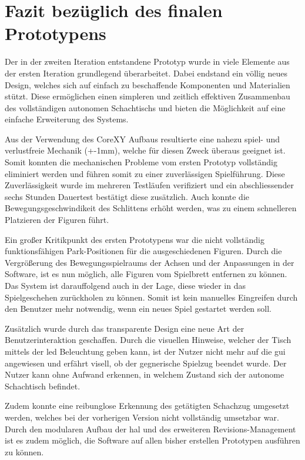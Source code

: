 \hypertarget{fazit-bezuxfcglich-des-finalen-prototypens}{%
\section{Fazit bezüglich des finalen
Prototypens}\label{fazit-bezuxfcglich-des-finalen-prototypens}}

Der in der zweiten Iteration entstandene Prototyp wurde in viele
Elemente aus der ersten Iteration grundlegend überarbeitet. Dabei
endstand ein völlig neues Design, welches sich auf einfach zu
beschaffende Komponenten und Materialien stützt. Diese ermöglichen einen
simpleren und zeitlich effektiven Zusammenbau des vollständigen
autonomen Schachtischs und bieten die Möglichkeit auf eine einfache
Erweiterung des Systems.

Aus der Verwendung des CoreXY Aufbaus resultierte eine nahezu spiel- und
verlustfreie Mechanik (+-1mm), welche für diesen Zweck überaus geeignet
ist. Somit konnten die mechanischen Probleme vom ersten Prototyp
vollständig eliminiert werden und führen somit zu einer zuverlässigen
Spielführung. Diese Zuverlässigkeit wurde im mehreren Testläufen
verifiziert und ein abschliessender sechs Stunden Dauertest bestätigt
diese zusätzlich. Auch konnte die Bewegungsgeschwindikeit des Schlittens
erhöht werden, was zu einem schnelleren Platzieren der Figuren führt.

Ein großer Kritikpunkt des ersten Prototypens war die nicht vollständig
funktionsfähigen Park-Positionen für die ausgeschiedenen Figuren. Durch
die Vergrößerung des Bewegungsspielraums der Achsen und der Anpassungen
in der Software, ist es nun möglich, alle Figuren vom Spielbrett
entfernen zu können. Das System ist darauffolgend auch in der Lage,
diese wieder in das Spielgeschehen zurückholen zu können. Somit ist kein
manuelles Eingreifen durch den Benutzer mehr notwendig, wenn ein neues
Spiel gestartet werden soll.

Zusätzlich wurde durch das transparente Design eine neue Art der
Benutzerinteraktion geschaffen. Durch die visuellen Hinweise, welcher
der Tisch mittels der \gls{led} Beleuchtung geben kann, ist der Nutzer
nicht mehr auf die \gls{gui} angewiesen und erfährt visell, ob der
gegnerische Spielzug beendet wurde. Der Nutzer kann ohne Aufwand
erkennen, in welchem Zustand sich der autonome Schachtisch befindet.

Zudem konnte eine reibunglose Erkennung des getätigten Schachzug
umgesetzt werden, welches bei der vorherigen Version nicht vollständig
umsetzbar war. Durch den modularen Aufbau der \gls{hal} und des
erweiteren Revisions-Management ist es zudem möglich, die Software auf
allen bisher erstellen Prototypen ausführen zu können.


